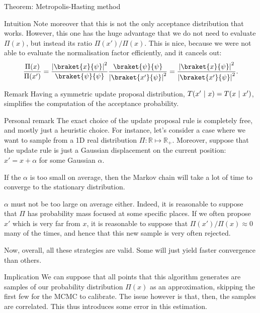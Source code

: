 \documentclass[a4paper]{article}
\begin{document}
\begin{parag}{Theorem: Metropolis-Hasting method}
\begin{subparag}{Intuition}
        Note moreover that this is not the only acceptance distribution that works. However, this one has the huge advantage that we do not need to evaluate $\Pi\left(x\right)$, but instead its ratio $\Pi\left(x'\right)/\Pi\left(x\right)$. This is nice, because we were not able to evaluate the normalisation factor efficiently, and it cancels out: 
        \[\frac{\Pi\left(x\right)}{\Pi\left(x'\right)} = \frac{\left|\braket{x}{\psi}\right|^2}{\braket{\psi}{\psi}} \frac{\braket{\psi}{\psi}}{\left|\braket{x'}{\psi}\right|^2} = \frac{\left|\braket{x}{\psi}\right|^2}{\left|\braket{x'}{\psi}\right|^2}.\]
    \end{subparag}

    \begin{subparag}{Remark}
        Having a symmetric update proposal distribution, $T\left(x' \suchthat x\right) = T\left(x \suchthat x'\right)$, simplifies the computation of the acceptance probability.
    \end{subparag}

    \begin{subparag}{Personal remark}
        The exact choice of the update proposal rule is completely free, and mostly just a heuristic choice. For instance, let's consider a case where we want to sample from a 1D real distribution $\Pi: \mathbb{R} \mapsto \mathbb{R}_+$. Moreover, suppose that the update rule is just a Gaussian displacement on the current position: $x' = x + \alpha$ for some Gaussian $\alpha$.

        If the $\alpha$ is too small on average, then the Markov chain will take a lot of time to converge to the stationary distribution.

        $\alpha$ must not be too large on average either. Indeed, it is reasonable to suppose that $\Pi$ has probability mass focused at some specific places. If we often propose $x'$ which is very far from $x$, it is reasonable to suppose that $\Pi\left(x'\right) / \Pi\left(x\right) \approx 0$ many of the times, and hence that this new sample is very often rejected.

        Now, overall, all these strategies are valid. Some will just yield faster convergence than others.
    \end{subparag}

    \begin{subparag}{Implication}
        We can suppose that all points that this algorithm generates are samples of our probability distribution $\Pi\left(x\right)$ as an approximation, skipping the first few for the MCMC to calibrate. The issue however is that, then, the samples are correlated. This thus introduces some error in this estimation.
    \end{subparag}
\end{parag}
\end{document}
